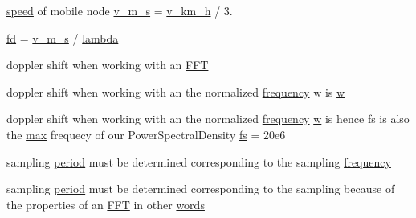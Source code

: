 \begin{DoxyCompactItemize}
\item 
\hyperlink{mmwave-amc-test_8cc_a6dc6e6f3c75c509ce943163afb5dade7}{speed} of mobile node \hyperlink{lte_2model_2fading-traces_2fading__trace__generator_8m_a59f0e4250bcce6edcd617a29fd06e564}{v\+\_\+m\+\_\+s} = \hyperlink{mmwave_2model_2fading-traces_2fading__trace__generator_8m_ae7f804d3a4530aaf512fd8c59271cfd2}{v\+\_\+km\+\_\+h} / 3.
\item 
\hyperlink{lte_2model_2fading-traces_2fading__trace__generator_8m_a44f21d5190b5a6df8089f54799628d7e}{fd} = \hyperlink{mmwave_2model_2fading-traces_2fading__trace__generator_8m_a59f0e4250bcce6edcd617a29fd06e564}{v\+\_\+m\+\_\+s} / \hyperlink{loss__ITU1411__NLOS__over__rooftop_8m_aca36b09d6e71a60cfa3837d7e24c07ca}{lambda}
\item 
doppler shift when working with an \hyperlink{lte_2model_2fading-traces_2fading__trace__generator_8m_ac4962f4e70dbd9d6f4994fd9698b6932}{F\+FT}
\item 
doppler shift when working with an the normalized \hyperlink{mmwave_2model_2fading-traces_2fading__trace__generator_8m_a09045328d6d7e16aa4013f526cc6993d}{frequency} w is \hyperlink{lte_2model_2fading-traces_2fading__trace__generator_8m_afd61ec66f9d7b807eece6eb12c781844}{w}
\item 
doppler shift when working with an the normalized \hyperlink{mmwave_2model_2fading-traces_2fading__trace__generator_8m_a09045328d6d7e16aa4013f526cc6993d}{frequency} \hyperlink{mmwave_2model_2fading-traces_2fading__trace__generator_8m_afd61ec66f9d7b807eece6eb12c781844}{w} is hence fs is also the \hyperlink{80211b_8c_affe776513b24d84b39af8ab0930fef7f}{max} frequecy of our Power\+Spectral\+Density \hyperlink{lte_2model_2fading-traces_2fading__trace__generator_8m_a9eba99c13508cc57a010f196f60992ff}{fs} = 20e6
\item 
sampling \hyperlink{mmwave_2model_2fading-traces_2fading__trace__generator_8m_ae10c944bf9f3fba2686a5885ecc192d7}{period} must be determined corresponding to the sampling \hyperlink{lte_2model_2fading-traces_2fading__trace__generator_8m_a09045328d6d7e16aa4013f526cc6993d}{frequency}
\item 
sampling \hyperlink{mmwave_2model_2fading-traces_2fading__trace__generator_8m_ae10c944bf9f3fba2686a5885ecc192d7}{period} must be determined corresponding to the sampling because of the properties of an \hyperlink{mmwave_2model_2fading-traces_2fading__trace__generator_8m_ac4962f4e70dbd9d6f4994fd9698b6932}{F\+FT} in other \hyperlink{lte_2model_2fading-traces_2fading__trace__generator_8m_af9a26b3e340bad66623028824688ed22}{words}

\end{DoxyCompactItemize}
